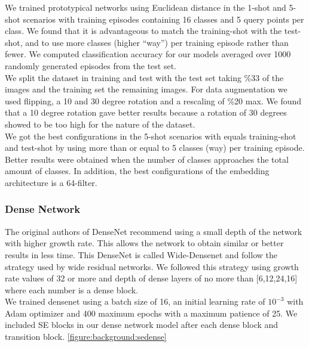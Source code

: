 \documentclass[runningheads,a4paper]{llncs}
\begin{document}
We trained prototypical networks using Euclidean distance in the 1-shot and 5-shot scenarios with training episodes containing 16 classes and 5 query points per class. We found that it is advantageous to match the training-shot with the test-shot, and to use more classes (higher “way”) per training episode rather than fewer. We computed classification accuracy for our models averaged over 1000 randomly generated episodes from the test set. \\

We split the dataset in training and test with the test set taking \%33 of the images and the training set the remaining images. For data augmentation we used flipping, a 10 and 30 degree rotation and a rescaling of \%20 max. We found that a 10 degree rotation gave better results because a rotation of 30 degrees showed to be too high for the nature of the dataset. \\

We got the best configurations in the 5-shot scenarios with equals training-shot and test-shot by using more than or equal to 5 classes (way) per training episode. Better results were obtained when the number of classes approaches the total amount of classes. In addition, the best configurations of the embedding architecture is a 64-filter.

\subsubsection{Dense Network}

The original authors of DenseNet recommend using a small depth of the network with higher growth rate. This allows the network to obtain similar or better results in less time. This DenseNet is called Wide-Densenet and follow the strategy used by wide residual networks\cite{wide_resnet}. We followed this strategy using growth rate values of 32 or more and depth of dense layers of no more than [6,12,24,16] where each number is a dense block. \\
We trained densenet using a batch size of 16, an initial learning rate of $10^{-3}$ with Adam optimizer and 400 maximum epochs with a maximum patience of 25. 
We included SE blocks in our dense network model after each dense block and transition block. \ref{figure:background:sedense} \\
\end{document}

